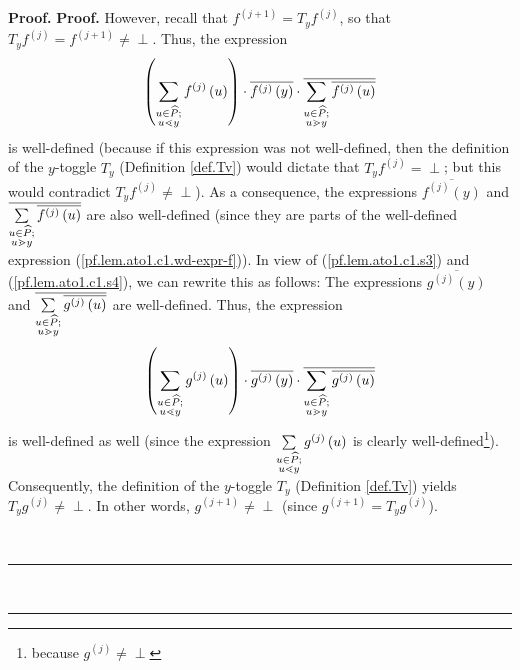 \documentclass[numbers=enddot,12pt,final,onecolumn,notitlepage]{scrartcl}%
\theoremstyle{definition}
\newenvironment{verlong}{}{}
\newcommand{\undf}{\operatorname*{\bot}}
\newenvironment{proof}[1][Proof]{\noindent\textbf{#1.} }{\ \rule{0.5em}{0.5em}}
\let\sumnonlimits\sum
\renewcommand{\sum}{\sumnonlimits\limits}
\begin{document}
\begin{verlong}
\begin{proof}
\begin{proof}
However, recall that $f^{\left(  j+1\right)  }=T_{y}f^{\left(  j\right)  }$,
so that $T_{y}f^{\left(  j\right)  }=f^{\left(  j+1\right)  }\neq\undf$. Thus,
the expression
\begin{equation}
\left(  \sum\limits_{\substack{u\in\widehat{P};\\u\lessdot y}}f^{\left(
j\right)  }\left(  u\right)  \right)  \cdot\overline{f^{\left(  j\right)
}\left(  y\right)  }\cdot\overline{\sum\limits_{\substack{u\in\widehat{P}%
;\\u\gtrdot y}}\overline{f^{\left(  j\right)  }\left(  u\right)  }}
\label{pf.lem.ato1.c1.wd-expr-f}%
\end{equation}
is well-defined (because if this expression was not well-defined, then the
definition of the $y$-toggle $T_{y}$ (Definition \ref{def.Tv}) would dictate
that $T_{y}f^{\left(  j\right)  }=\undf$; but this would contradict
$T_{y}f^{\left(  j\right)  }\neq\undf$). As a consequence, the expressions
$\overline{f^{\left(  j\right)  }\left(  y\right)  }$ and $\overline
{\sum\limits_{\substack{u\in\widehat{P};\\u\gtrdot y}}\overline{f^{\left(
j\right)  }\left(  u\right)  }}$ are also well-defined (since they are parts
of the well-defined expression (\ref{pf.lem.ato1.c1.wd-expr-f})). In view of
(\ref{pf.lem.ato1.c1.s3}) and (\ref{pf.lem.ato1.c1.s4}), we can rewrite this
as follows: The expressions $\overline{g^{\left(  j\right)  }\left(  y\right)
}$ and $\overline{\sum\limits_{\substack{u\in\widehat{P};\\u\gtrdot
y}}\overline{g^{\left(  j\right)  }\left(  u\right)  }}$ are well-defined.
Thus, the expression%
\begin{equation}
\left(  \sum\limits_{\substack{u\in\widehat{P};\\u\lessdot y}}g^{\left(
j\right)  }\left(  u\right)  \right)  \cdot\overline{g^{\left(  j\right)
}\left(  y\right)  }\cdot\overline{\sum\limits_{\substack{u\in\widehat{P}%
;\\u\gtrdot y}}\overline{g^{\left(  j\right)  }\left(  u\right)  }}
\label{pf.lem.ato1.c1.wd-expr-g}%
\end{equation}
is well-defined as well (since the expression $\sum\limits_{\substack{u\in
\widehat{P};\\u\lessdot y}}g^{\left(  j\right)  }\left(  u\right)  $ is
clearly well-defined\footnote{because $g^{\left(  j\right)  }\neq\undf$}).
Consequently, the definition of the $y$-toggle $T_{y}$ (Definition
\ref{def.Tv}) yields $T_{y}g^{\left(  j\right)  }\neq\undf$. In other words,
$g^{\left(  j+1\right)  }\neq\undf$ (since $g^{\left(  j+1\right)  }%
=T_{y}g^{\left(  j\right)  }$).


\end{proof}
\end{proof}
\end{verlong}
\end{document}
